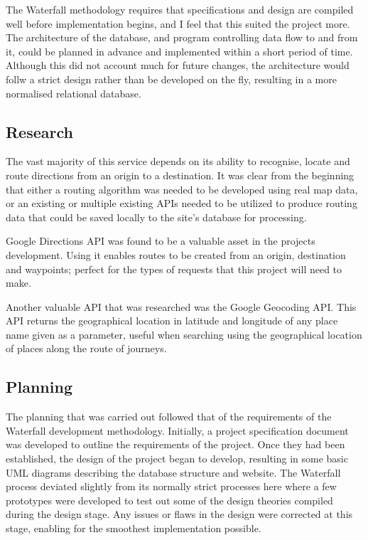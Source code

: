 The Waterfall methodology requires that specifications and design are compiled well before implementation begins, and I feel that this suited the project more. The architecture of the database, and program controlling data flow to and from it, could be planned in advance and implemented within a short period of time. Although this did not account much for future changes, the architecture would follw a strict design rather than be developed on the fly, resulting in a more normalised relational database.

\subsection{Research}
The vast majority of this service depends on its ability to recognise, locate and route directions from an origin to a destination. It was clear from the beginning that either a routing algorithm was needed to be developed using real map data, or an existing or multiple existing APIs needed to be utilized to produce routing data that could be saved locally to the site's database for processing. 

Google Directions API\cite{google_directions_api} was found to be a valuable asset in the projects development. Using it enables routes to be created from an origin, destination and waypoints; perfect for the types of requests that this project will need to make. 

Another valuable API that was researched was the Google Geocoding API\cite{google_geocoding_api}. This API returns the geographical location in latitude and longitude of any place name given as a parameter, useful when searching using the geographical location of places along the route of journeys.

\subsection{Planning}
The planning that was carried out followed that of the requirements of the Waterfall development methodology. Initially, a project specification document was developed to outline the requirements of the project. Once they had been established, the design of the project began to develop, resulting in some basic UML diagrams describing the database structure and website. The Waterfall process deviated slightly from its normally strict processes here where a few prototypes were developed to test out some of the design theories compiled during the design stage. Any issues or flaws in the design were corrected at this stage, enabling for the smoothest implementation possible.


